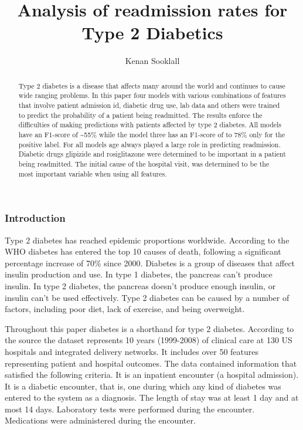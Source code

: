 \documentclass[5p]{elsarticle} %
\begin{document}
\begin{frontmatter}

  \title{Analysis of readmission rates for Type 2 Diabetics}
    \author[CUNY-SPS]{Kenan Sooklall}
  
  \begin{abstract}
  Type 2 diabetes is a disease that affects many around the world and
  continues to cause wide ranging problems. In this paper four models
  with various combinations of features that involve patient admission
  id, diabetic drug use, lab data and others were trained to predict the
  probability of a patient being readmitted. The results enforce the
  difficulties of making predictions with patients affected by type 2
  diabetes. All models have an F1-score of \textasciitilde55\% while the
  model three has an F1-score of to 78\% only for the positive label.
  For all models age always played a large role in predicting
  readmission. Diabetic drugs glipizide and rosiglitazone were
  determined to be important in a patient being readmitted. The initial
  cause of the hospital visit, was determined to be the most important
  variable when using all features.
  \end{abstract}
  
 \end{frontmatter}

\hypertarget{introduction}{%
\subsubsection{Introduction}\label{introduction}}

Type 2 diabetes has reached epidemic proportions worldwide. According to
the WHO diabetes has entered the top 10 causes of death, following a
significant percentage increase of 70\% since 2000. Diabetes is a group
of diseases that affect insulin production and use. In type 1 diabetes,
the pancreas can't produce insulin. In type 2 diabetes, the pancreas
doesn't produce enough insulin, or insulin can't be used effectively.
Type 2 diabetes can be caused by a number of factors, including poor
diet, lack of exercise, and being overweight.

Throughout this paper diabetes is a shorthand for type 2 diabetes.
According to the source the dataset represents 10 years (1999-2008) of
clinical care at 130 US hospitals and integrated delivery networks. It
includes over 50 features representing patient and hospital outcomes.
The data contained information that satisfied the following criteria. It
is an inpatient encounter (a hospital admission). It is a diabetic
encounter, that is, one during which any kind of diabetes was entered to
the system as a diagnosis. The length of stay was at least 1 day and at
most 14 days. Laboratory tests were performed during the encounter.
Medications were administered during the encounter.
\end{document}

